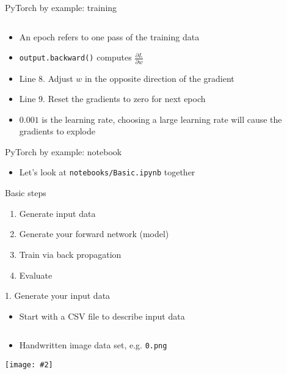 \documentclass[hyperref={pdfpagelabels=false},12pt]{beamer}
\newcommand{\ig}[2]{\texttt{[image: \#2]}}
\newcommand{\code}[2]{\texttt{#2}}
\newcommand{\pygment}[3]{\inputminted[bgcolor=lightgray,linenos,fontsize=#1]{#2}{#3}}
\newcommand{\pygmentLines}[5]{\inputminted[bgcolor=lightgray,linenos,fontsize=#1,firstline=#2,lastline=#3,autogobble]{#4}{#5}}
\begin{document}
\begin{frame}{PyTorch by example: training}
  \pygment{\scriptsize}{python}{code/basic-training.2.py}
  \vspace{-0.5cm}
  \begin{itemize}
      \item An epoch refers to one pass of the training data
      \item \code{python}{output.backward()} computes $\frac{\partial L}{\partial w}$
      \item Line 8. Adjust $w$ in the opposite direction of the gradient
      \item Line 9. Reset the gradients to zero for next epoch
      \item $0.001$ is the learning rate, choosing a large learning rate will cause
        the gradients to explode
  \end{itemize}
\end{frame}

\begin{frame}{PyTorch by example: notebook}
  \begin{itemize}
    \item Let's look at \texttt{notebooks/Basic.ipynb} together
  \end{itemize}
\end{frame}

\begin{frame}{Basic steps}
  \begin{enumerate}
      \item Generate input data
      \item Generate your forward network (model)
      \item Train via back propagation
      \item Evaluate
  \end{enumerate}
\end{frame}

\begin{frame}{1. Generate your input data}
  \begin{itemize}
    \item Start with a CSV file to describe input data
  \end{itemize}
  \pygmentLines{\scriptsize}{1}{5}{text}{data/mnist.csv}
  \begin{itemize}
    \item Handwritten image data set, e.g. \texttt{0.png}
  \end{itemize}
  \begin{center}
    \ig{0.25}{figures/0.png}
  \end{center}
\end{frame}
\end{document}
